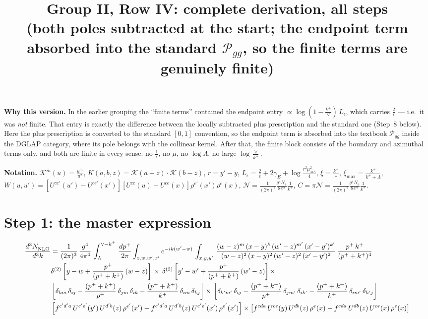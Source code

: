 \documentclass[9pt]{article}
\title{Group II, Row IV: complete derivation, all steps\\
{\normalsize (both poles subtracted at the start; the endpoint term absorbed into the standard
$\mathcal P_{gg}$, so the finite terms are genuinely finite)}}
\author{}
\date{}
\newcommand{\Leps}{L_{\epsilon}}
\begin{document}
\maketitle
\vspace{-2.0em}

{\color{red}\textbf{Why this version.} In the earlier grouping the ``finite terms'' contained
the endpoint entry $\propto\log(1-\frac{k^{+}}{\vee})\,\Leps$, which carries
$\frac{2}{\epsilon}$ --- i.e.\ it was \emph{not} finite. That entry is exactly the difference
between the locally subtracted plus prescription and the standard one
(Step~8 below). Here the plus prescription is converted to the standard $[0,1]$ convention, so
the endpoint term is absorbed into the textbook $\mathcal P_{gg}$ inside the DGLAP category,
where its pole belongs with the collinear kernel. After that, the finite block consists of the
boundary and azimuthal terms only, and both are finite in every sense: no $\frac1\epsilon$, no
$\mu$, no $\log\Lambda$, no large $\log\frac{\vee}{k^{+}}$.}

\textbf{Notation.} $\mathcal K^{m}(u)=\frac{u^{m}}{u^{2}}$,
$K(a,b,z)=\mathcal K(a-z)\!\cdot\!\mathcal K(b-z)$, $r=y'-y$,
$\Leps=\frac{2}{\epsilon}+2\gamma_{E}+\log\frac{r^{2}\mu^{2}_{\overline{MS}}}{4}$,
$\bar\xi=\frac{k^{+}}{\vee}$, $\xi_{\max}=\frac{k^{+}}{k^{+}+\Lambda}$,
$W(u,u')=[U^{ce'}(u')-U^{ce'}(x')][U^{ce}(u)-U^{ce}(x)]\rho^{e'}(x')\rho^{e}(x)$,
$\mathcal N=\frac{1}{(2\pi)^{3}}\frac{g^{4}N_{c}}{8\pi^{5}}\frac{1}{k^{+}}$,
$C=\pi\mathcal N=\frac{1}{(2\pi)^{3}}\frac{g^{4}N_{c}}{8\pi^{4}}\frac{1}{k^{+}}$.

\section{Step 1: the master expression}
\begin{align} \label{eq:first}
     \frac{d^{3}N_{\rm NLO}^{\rm}}{d^{3}k}  & = \frac{1}{(2\pi)^{3}}\,\frac{g^{4}}{4\pi^{4}}\,\int_{\Lambda}^{\vee-k^{+}}\, \frac{dp^{+}}{2\pi}\int_{z,w,w^{\prime},x'} e^{-ik(w^{\prime}-w)}\,  \int_{x,y,y^{\prime}}\,\frac{(w-z)^{m}\,(x-y)^{k}\,(w'-z)^{m'}\,(x'-y')^{k'}}{(w-z)^{2}\,(x-y)^{2}\,(w'-z)^{2}\,(x'-y')^{2}}\,\frac{p^{+}\,k^{+}}{(p^{+}+k^{+})^{4}}\notag \\ & \delta^{(2)}\left[y-w+\frac{p^{+}}{(p^{+}+k^{+})}\,(w-z)\right]\,\times\, \delta^{(2)}\left[y'-w'+\frac{p^{+}}{(p^{+}+k^{+})}\,(w'-z)\right]\times\notag \\ &  \left[\delta_{km}\,\delta_{ij}-\frac{(p^{+}+k^{+})}{p^{+}}\,\delta_{jm}\,\delta_{ik}-\frac{(p^{+}+k^{+})}{k^{+}}\,\delta_{im}\,\delta_{kj}\right]\times\, \left[\delta_{k'm'}\,\delta_{ij}-\frac{(p^{+}+k^{+})}{p^{+}}\,\delta_{jm'}\,\delta_{ik'}-\frac{(p^{+}+k^{+})}{k^{+}}\,\delta_{im'}\,\delta_{k'j}\right]\notag \\ & \left[f^{c'd'a}\,U^{c'e'}(y')\,U^{d'b}(z)\,\rho^{e'}(x')-f^{c'd'a}\,
    U^{d'b}(z)\,U^{c'e'}(x')\,\rho^{e'}(x')\right]\times \left[f^{cda}\,U^{ce}(y)\,U^{db}(z)\,\rho^{e}(x)-f^{cda}\,
    U^{db}(z)\,U^{ce}(x)\,\rho^{e}(x)\right]
\end{align}
\end{document}
